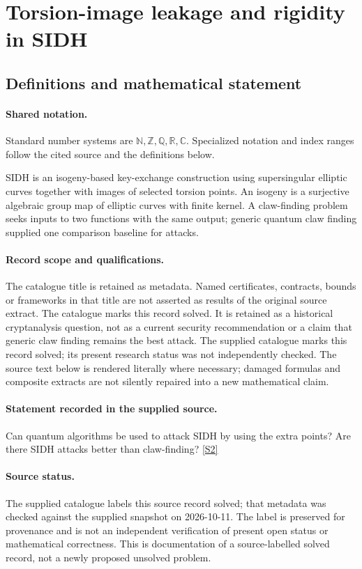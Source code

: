 \documentclass[11pt]{article}
\newcommand{\sref}[2]{\hyperlink{source:#1:#2}{[S#2]}}
\begin{document}
\section{Torsion-image leakage and rigidity in SIDH}\label{statement}

\subsection{Definitions and mathematical statement}

\paragraph{Shared notation.}Standard number systems are $\mathbb N,\mathbb Z,\mathbb Q,\mathbb R,\mathbb C$. Specialized notation and index ranges follow the cited source and the definitions below.


SIDH is an isogeny-based key-exchange construction using supersingular elliptic curves together with images of selected torsion points. An isogeny is a surjective algebraic group map of elliptic curves with finite kernel. A claw-finding problem seeks inputs to two functions with the same output; generic quantum claw finding supplied one comparison baseline for attacks.
\paragraph{Record scope and qualifications.}
The catalogue title is retained as metadata. Named certificates, contracts, bounds or frameworks in that title are not asserted as results of the original source extract.
The catalogue marks this record solved. It is retained as a historical cryptanalysis question, not as a current security recommendation or a claim that generic claw finding remains the best attack. The supplied catalogue marks this record solved; its present research status was not independently checked.
The source text below is rendered literally where necessary; damaged formulas and composite extracts are not silently repaired into a new mathematical claim.
\paragraph{Statement recorded in the supplied source.}
Can quantum algorithms be used to attack SIDH by using the extra points? Are there SIDH attacks better than claw-finding? \sref{statement}{2}
\paragraph{Source status.}
The supplied catalogue labels this source record solved; that metadata was checked against the supplied snapshot on 2026-10-11. The label is preserved for provenance and is not an independent verification of present open status or mathematical correctness. This is documentation of a source-labelled solved record, not a newly proposed unsolved problem.
\end{document}
